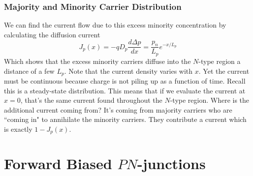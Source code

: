\subsubsection*{Majority and Minority Carrier Distribution}
We can find the current flow due to this excess minority concentration by calculating the diffusion current
    \begin{equation}
        J_p(x) = -q D_p \frac{d \Delta p}{dx} = \frac{p_n}{L_p} e^{-x/L_p} 
    \end{equation}	
Which shows that the excess minority carriers diffuse into the $N$-type region a distance of a few $L_p$.  Note that the current density varies with $x$.  Yet the current must be continuous because charge is not piling up as a function of time.  Recall this is a steady-state distribution.  This means that if we evaluate the current at $x = 0$, that's the same current found throughout the $N$-type region. 
Where is the additional current coming from?  It's coming from majority carriers who are ``coming in" to annihilate the minority carriers.  They contribute a current which is exactly $1- J_p(x)$.  
\section{Forward Biased $PN$-junctions}
